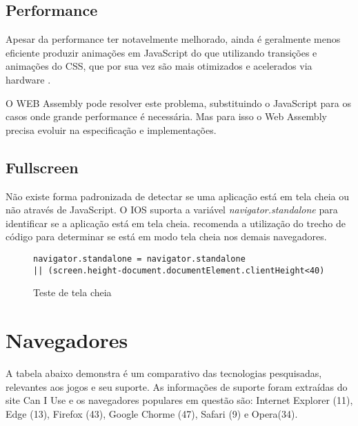 \subsection{Performance}

Apesar da performance ter notavelmente melhorado, ainda é geralmente
menos eficiente produzir animações em JavaScript do que utilizando
transições e animações do CSS, que por sua vez são mais otimizados
e acelerados via hardware \autocite{html5mostwanted}.

O WEB Assembly pode resolver este problema, substituindo o JavaScript
para os casos onde grande performance é necessária. Mas para isso o
Web Assembly precisa evoluir na especificação e implementações.

\subsection{Fullscreen}

Não existe forma padronizada de detectar se uma aplicação está em
tela cheia ou não através de JavaScript. O IOS suporta a variável
\textit{navigator.standalone } para identificar se a aplicação está
em tela cheia. \cite{homescreenwebapps} recomenda a utilização do
trecho de código para determinar se está em modo tela cheia
nos demais navegadores.

\begin{figure}[H]
\centering
\begin{verbatim}
navigator.standalone = navigator.standalone 
|| (screen.height-document.documentElement.clientHeight<40)
\end{verbatim}
\caption{Teste de tela cheia}
\label{fig:fixJSTypes}
\end{figure}

\section{Navegadores}

A tabela abaixo demonstra é um comparativo das tecnologias pesquisadas,
relevantes aos jogos e seu suporte. As informações de suporte foram
extraídas do site Can I Use e os navegadores populares em questão
são: Internet Explorer (11), Edge (13), Firefox (43), Google Chorme
(47), Safari (9) e Opera(34).

